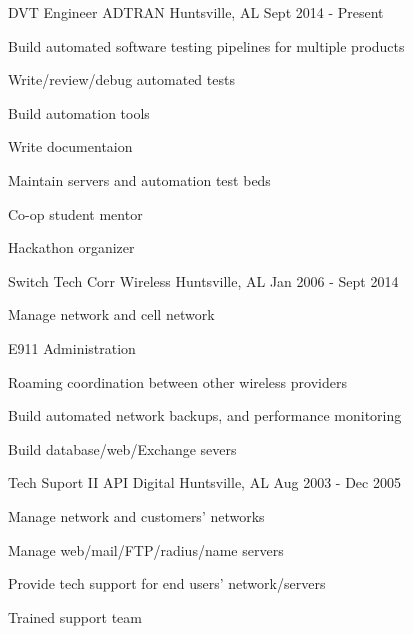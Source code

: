 
\begin{cventries}
  \cventry
    {DVT Engineer} %
    {ADTRAN} %
    {Huntsville, AL} %
    {Sept 2014 - Present} %
    {
      \begin{cvitems} %
        \item {Build automated software testing pipelines for multiple products}
        \item {Write/review/debug automated tests}
        \item {Build automation tools}
        \item {Write documentaion}
        \item {Maintain servers and automation test beds}
        \item {Co-op student mentor}
        \item {Hackathon organizer}
      \end{cvitems}
    }

  \cventry
    {Switch Tech} %
    {Corr Wireless} %
    {Huntsville, AL} %
    {Jan 2006 - Sept 2014} %
    {
      \begin{cvitems} %
        \item {Manage network and cell network}
        \item {E911 Administration}
        \item {Roaming coordination between other wireless providers}
        \item {Build automated network backups, and performance monitoring}
        \item {Build database/web/Exchange severs}
      \end{cvitems}
    }

  \cventry
    {Tech Suport II} %
    {API Digital} %
    {Huntsville, AL} %
    {Aug 2003 - Dec 2005} %
    {
      \begin{cvitems} %
        \item {Manage network and customers' networks}
        \item {Manage web/mail/FTP/radius/name servers}
        \item {Provide tech support for end users' network/servers}
        \item {Trained support team}
      \end{cvitems}
    }

\end{cventries}
